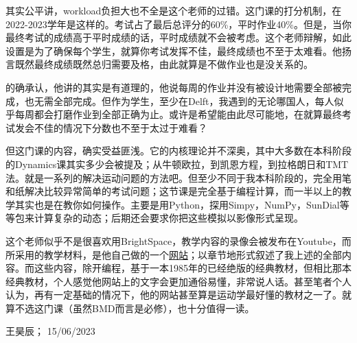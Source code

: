 其实公平讲，workload负担大也不全是这个老师的过错。这门课的打分机制，在2022-2023学年是这样的。考试占了最后总评分的60\%，平时作业40\%。但是，当你最终考试的成绩高于平时成绩的话，平时成绩就不会被考虑。这个老师辩解，如此设置是为了确保每个学生，就算你考试发挥不佳，最终成绩也不至于太难看。他扬言既然最终成绩既然总归需要及格，由此就算是不做作业也是没关系的。

的确承认，他讲的其实是有道理的，他说每周的作业并没有被设计地需要全部被完成，也无需全部完成。但作为学生，至少在Delft，我遇到的无论哪国人，每人似乎每周都会打磨作业到全部正确为止。或许是希望能由此尽可能地，在就算最终考试发会不佳的情况下分数也不至于太过于难看？

但这门课的内容，确实受益匪浅。它的内核理论并不深奥，其中大多数在本科阶段的Dynamics课其实多少会被提及；从牛顿欧拉，到凯恩方程，到拉格朗日和TMT法。就是一系列的解决运动问题的方法吧。但至少不同于我本科阶段的，完全用笔和纸解决比较异常简单的考试问题；这节课是完全基于编程计算，而一半以上的教学其实也是在教你如何操作。主要是用Python，探用Simpy，NumPy，SunDial等等包来计算复杂的动态；后期还会要求你把这些模拟以影像形式呈现。

这个老师似乎不是很喜欢用BrightSpace，教学内容的录像会被发布在Youtube，而所采用的教学材料，是他自己做的一个\href{https://moorepants.github.io/learn-multibody-dynamics/}{\uline{网站}}；以章节地形式叙述了我上述的全部内容。而这些内容，除开编程，基于一本1985年的已经绝版的经典教材，但相比那本经典教材，个人感觉他网站上的文字会更加通俗易懂，非常说人话。甚至笔者个人认为，再有一定基础的情况下，他的网站甚至算是运动学最好懂的教材之一了。就算不选这门课（虽然BMD而言是必修），也十分值得一读。
\begin{flushright}
王昊辰； 15/06/2023
\end{flushright}

